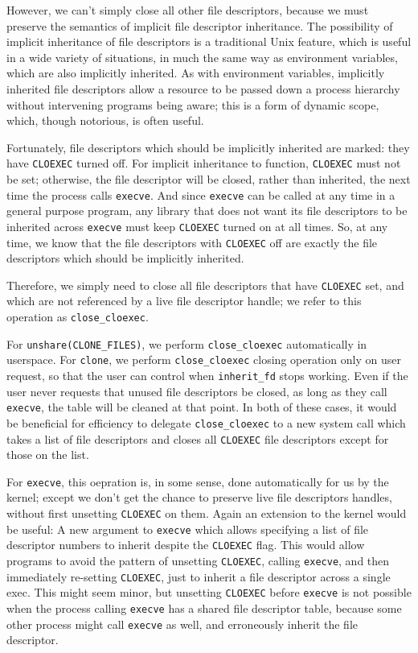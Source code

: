 \documentclass[sigplan]{acmart}
\begin{document}
However, we can't simply close all other file descriptors,
because we must preserve the semantics of implicit file descriptor inheritance.
The possibility of implicit inheritance of file descriptors is a traditional Unix feature,
which is useful in a wide variety of situations,
in much the same way as environment variables, which are also implicitly inherited.
As with environment variables,
implicitly inherited file descriptors allow a resource to be passed down a process hierarchy
without intervening programs being aware;
this is a form of dynamic scope, which, though notorious, is often useful.

Fortunately, file descriptors which should be implicitly inherited are marked:
they have \texttt{CLOEXEC} turned off.
For implicit inheritance to function, \texttt{CLOEXEC} must not be set;
otherwise, the file descriptor will be closed, rather than inherited,
the next time the process calls \texttt{execve}.
And since \texttt{execve} can be called at any time in a general purpose program,
any library that does not want its file descriptors to be inherited across \texttt{execve}
must keep \texttt{CLOEXEC} turned on at all times.
So, at any time, we know that the file descriptors with \texttt{CLOEXEC} off
are exactly the file descriptors which should be implicitly inherited.

Therefore, we simply need to close all file descriptors that have \texttt{CLOEXEC} set,
and which are not referenced by a live file descriptor handle;
we refer to this operation as \verb|close_cloexec|.

For \verb|unshare(CLONE_FILES)|, we perform \verb|close_cloexec| automatically in userspace.
For \texttt{clone}, we perform \verb|close_cloexec| closing operation only on user request,
so that the user can control when \verb|inherit_fd| stops working.
Even if the user never requests that unused file descriptors be closed,
as long as they call \texttt{execve}, the table will be cleaned at that point.
In both of these cases,
it would be beneficial for efficiency to delegate \verb|close_cloexec|
to a new system call which takes a list of file descriptors
and closes all \texttt{CLOEXEC} file descriptors except for those on the list.

For \texttt{execve}, this oepration is, in some sense, done automatically for us by the kernel;
except we don't get the chance to preserve live file descriptors handles,
without first unsetting \texttt{CLOEXEC} on them.
Again an extension to the kernel would be useful:
A new argument to \texttt{execve} which allows specifying a list of file descriptor numbers to inherit
despite the \texttt{CLOEXEC} flag.
This would allow programs to avoid the pattern
of unsetting \texttt{CLOEXEC}, calling \texttt{execve}, and then immediately re-setting \texttt{CLOEXEC},
just to inherit a file descriptor across a single exec.
This might seem minor,
but unsetting \texttt{CLOEXEC} before \texttt{execve} is not possible
when the process calling \texttt{execve} has a shared file descriptor table,
because some other process might call \texttt{execve} as well,
and erroneously inherit the file descriptor.
\end{document}
